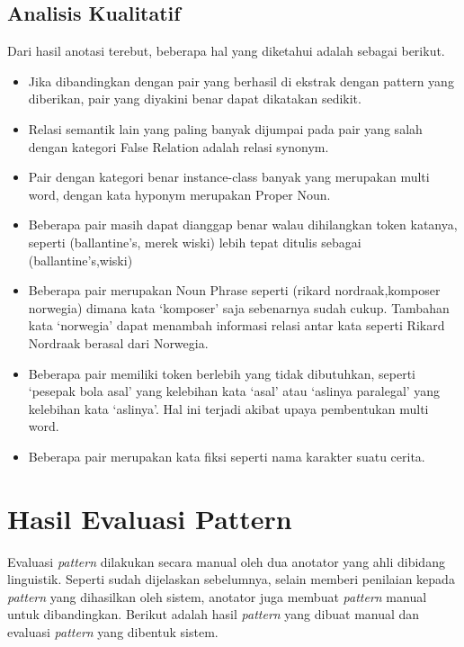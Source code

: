 \subsection{Analisis Kualitatif}
Dari hasil anotasi terebut, beberapa hal yang diketahui adalah sebagai berikut.
\begin{itemize}
  \item Jika dibandingkan dengan pair yang berhasil di ekstrak dengan pattern yang diberikan, pair yang diyakini benar dapat dikatakan sedikit. 
  \item Relasi semantik lain yang paling banyak dijumpai pada pair yang salah dengan kategori False Relation adalah relasi synonym. 
  \item Pair dengan kategori benar instance-class banyak yang merupakan multi word, dengan kata hyponym merupakan Proper Noun. 
  \item Beberapa pair masih dapat dianggap benar walau dihilangkan token katanya, seperti (ballantine's, merek wiski) lebih tepat ditulis sebagai (ballantine's,wiski)
  \item Beberapa pair merupakan Noun Phrase seperti (rikard nordraak,komposer norwegia) dimana kata `komposer' saja sebenarnya sudah cukup. Tambahan kata `norwegia' dapat menambah informasi relasi antar kata seperti Rikard Nordraak berasal dari Norwegia.
  \item Beberapa pair memiliki token berlebih yang tidak dibutuhkan, seperti `pesepak bola asal' yang kelebihan kata `asal' atau `aslinya paralegal' yang kelebihan kata `aslinya'. Hal ini terjadi akibat upaya pembentukan multi word. 
  \item Beberapa pair merupakan kata fiksi seperti nama karakter suatu cerita.
\end{itemize}

%
\section{Hasil Evaluasi Pattern}
Evaluasi \textit{pattern} dilakukan secara manual oleh dua anotator yang ahli dibidang linguistik. Seperti sudah dijelaskan sebelumnya, selain memberi penilaian kepada \textit{pattern} yang dihasilkan oleh sistem, anotator juga membuat \textit{pattern} manual untuk dibandingkan. Berikut adalah hasil \textit{pattern} yang dibuat manual dan evaluasi \textit{pattern} yang dibentuk sistem.

